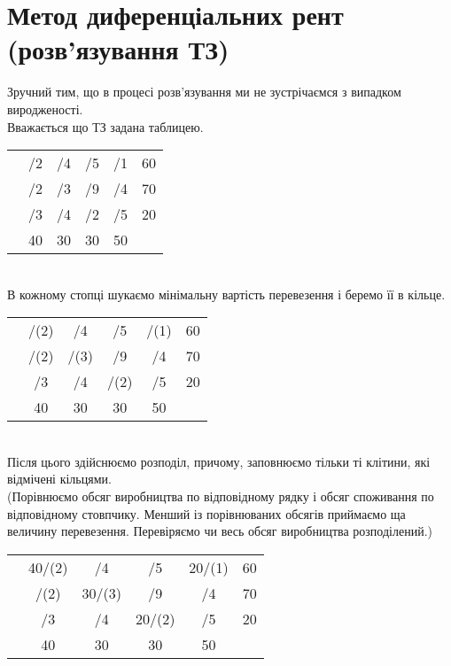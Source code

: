 \documentclass[12pt,a4paper]{book}
\begin{document}
\section{Метод диференціальних рент (розв’язування ТЗ)}
Зручний тим, що в процесі розв’язування ми не зустрічаємся з випадком виродженості.\\
Вважається що ТЗ задана таблицею.\\
\begin{tabular}{ | c | c | c | c | c | c | }
\hline
	&		&		&		&		&\\
\hline
	&	/2	&	/4	&	/5	&	/1	&	60\\
\hline
	&	/2	&	/3	&	/9	&	/4	&	70\\
\hline
	&	/3	&	/4	&	/2	&	/5	&	20\\
\hline
	&	40	&	30	&	30	&	50	&\\
\hline
\end{tabular}\\
В кожному стопці шукаємо мінімальну вартість перевезення і беремо її в кільце.\\
\begin{tabular}{ | c | c | c | c | c | c | }
\hline
	&		&		&		&		&\\
\hline
	&	/(2)	&	/4	&	/5	&	/(1)	&	60\\
\hline
	&	/(2)	&	/(3)	&	/9	&	/4	&	70\\
\hline
	&	/3	&	/4	&	/(2)	&	/5	&	20\\
\hline
	&	40	&	30	&	30	&	50	&\\
\hline
\end{tabular}\\
Після цього здійснюємо розподіл, причому, заповнюємо тільки ті клітини, які відмічені кільцями.\\
(Порівнюємо обсяг виробництва по відповідному рядку і обсяг споживання по відповідному стовпчику. Менший із порівнюваних обсягів приймаємо ща величину перевезення. Перевіряємо чи весь обсяг виробництва розподілений.)\\
\begin{tabular}{ | c | c | c | c | c | c | }
\hline
	&		&		&		&		&\\
\hline
	&	40/(2)	&	/4	&	/5	&	20/(1)	&	60\\
\hline
	&	/(2)	&	30/(3)	&	/9	&	/4	&	70\\
\hline
	&	/3	&	/4	&	20/(2)	&	/5	&	20\\
\hline
	&	40	&	30	&	30	&	50	&\\
\hline
\end{tabular}\\
\end{document}
